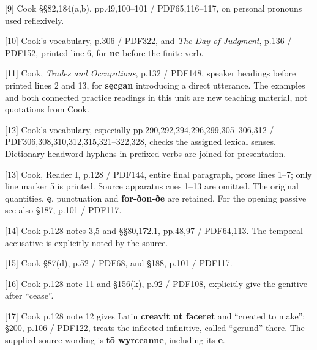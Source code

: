 [9] Cook §§82,184(a,b), pp.49,100–101 /\allowbreak{} PDF65,116–117, on personal pronouns used reflexively.

[10] Cook’s vocabulary, p.306 /\allowbreak{} PDF322, and \emph{The Day of Judgment}, p.136 /\allowbreak{} PDF152, printed line 6, for \textbf{ne} before the finite verb.

[11] Cook, \emph{Trades and Occupations}, p.132 /\allowbreak{} PDF148, speaker headings before printed lines 2 and 13, for \textbf{sęcgan} introducing a direct utterance. The examples and both connected practice readings in this unit are new teaching material, not quotations from Cook.

[12] Cook’s vocabulary, especially pp.290,292,294,296,299,305–306,312 /\allowbreak{} PDF306,308,310,312,315,321–322,328, checks the assigned lexical senses. Dictionary headword hyphens in prefixed verbs are joined for presentation.

[13] Cook, Reader I, p.128 /\allowbreak{} PDF144, entire final paragraph, prose lines 1–7; only line marker 5 is printed. Source apparatus cues 1–13 are omitted. The original quantities, \textbf{ę}, punctuation and \textbf{for-ðon-ðe} are retained. For the opening passive see also §187, p.101 /\allowbreak{} PDF117.

[14] Cook p.128 notes 3,5 and §§80,172.1, pp.48,97 /\allowbreak{} PDF64,113. The temporal accusative is explicitly noted by the source.

[15] Cook §87(d), p.52 /\allowbreak{} PDF68, and §188, p.101 /\allowbreak{} PDF117.

[16] Cook p.128 note 11 and §156(k), p.92 /\allowbreak{} PDF108, explicitly give the genitive after “cease”.

[17] Cook p.128 note 12 gives Latin \textbf{creavit ut faceret} and “created to make”; §200, p.106 /\allowbreak{} PDF122, treats the inflected infinitive, called “gerund” there. The supplied source wording is \textbf{tō wyrceanne}, including its \textbf{e}.

\endgroup

